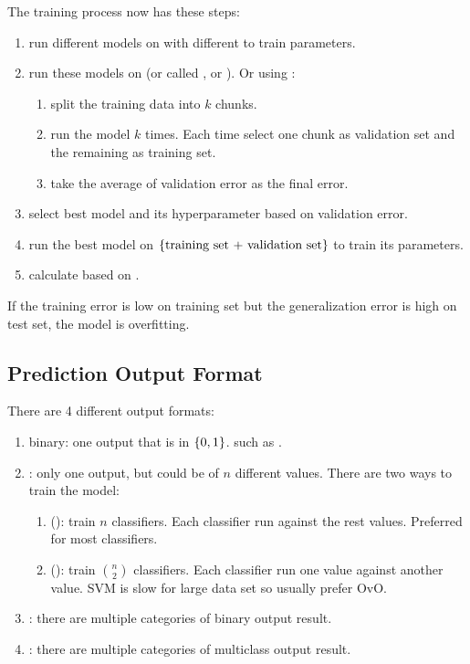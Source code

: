 The training process now has these steps:
\begin{enumerate}
	\item run different models on  with different  to train parameters.
	\item run these models on  (or called , or ). Or using :
        \begin{enumerate}
            \item split the training data into $k$ chunks.
            \item run the model $k$ times. Each time select one chunk as validation set and the remaining as training set.
            \item take the average of validation error as the final error.
        \end{enumerate}
	\item select best model and its hyperparameter based on validation error.
	\item run the best model on $\set{\text{training set + validation set}}$ to train its parameters.
	\item calculate  based on .
\end{enumerate}




If the training error is low on training set but the generalization error is high on test set, the model is overfitting. 








\subsection{Prediction Output Format}


There are 4 different output formats:
\begin{enumerate}
    \item binary: one output that is in $\set{ 0, 1}$. such as .
    \item {}: only one output, but could be of $n$ different values. There are two ways to train the model:
        \begin{enumerate}
            \item {} (): train $n$ classifiers. Each classifier run against the rest values. Preferred for most classifiers.
            \item {} (): train $\binom{n}{2}$ classifiers. Each classifier run one value against another value. SVM is slow for large data set so usually prefer OvO.
        \end{enumerate}
    \item {}: there are multiple categories of binary output result.
    \item {}: there are multiple categories of multiclass output result.
\end{enumerate}





